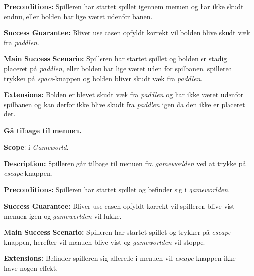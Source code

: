 \textbf{Preconditions:}\newline
Spilleren har startet spillet igennem menuen og har ikke skudt endnu, eller bolden har lige været udenfor banen.\newline

\textbf{Success Guarantee:}\newline
Bliver use casen opfyldt korrekt vil bolden blive skudt væk fra \textit{paddlen}.\newline

\textbf{Main Success Scenario:}\newline
Spilleren har startet spillet og bolden er stadig placeret på \textit{paddlen}, eller bolden har lige været uden for spilbanen. spilleren trykker på \textit{space}-knappen og bolden bliver skudt væk fra \textit{paddlen}.\newline

\textbf{Extensions:}\newline
Bolden er blevet skudt væk fra \textit{paddlen} og har ikke været udenfor spilbanen og kan derfor ikke blive skudt fra \textit{paddlen} igen da den ikke er placeret der.\newline \newline


\textbf{Gå tilbage til menuen.}\newline

\textbf{Scope:}\newline
i \textit{Gameworld}.\newline

\textbf{Description:} \newline
Spilleren går tilbage til menuen fra \textit{gameworlden} ved at trykke på \textit{escape}-knappen.\newline

\textbf{Preconditions:}\newline
Spilleren har startet spillet og befinder sig i \textit{gameworlden}.\newline

\textbf{Success Guarantee:}\newline
Bliver use casen opfyldt korrekt vil spilleren blive vist menuen igen og \textit{gameworlden} vil lukke.\newline

\textbf{Main Success Scenario:}\newline
Spilleren har startet spillet og trykker på \textit{escape}-knappen, herefter vil menuen blive vist og \textit{gameworlden} vil stoppe. \newline

\textbf{Extensions:}\newline
Befinder spilleren sig allerede i menuen vil \textit{escape}-knappen ikke have nogen effekt.\newline